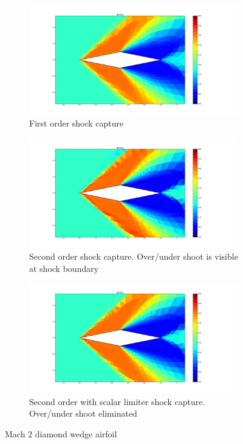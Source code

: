 \documentclass[12pt,parskip=full]{article}
\numberwithin{subsection}{section}
\begin{document}
		\begin{figure}[H]
			\centering
			\begin{subfigure}[H]{0.6\textwidth}
				\includegraphics[width=\textwidth,trim={7cm 2cm 10cm 2cm},clip]{FirstOrderShock.pdf}
				\caption{First order shock capture}
			\end{subfigure}
			\begin{subfigure}[H]{0.6\textwidth}
				\includegraphics[width=\textwidth,trim={7cm 2cm 10cm 2cm},clip]{SecondOrderShock.pdf}
				\caption{Second order shock capture. Over/under shoot is visible at shock boundary}
			\end{subfigure}
			\begin{subfigure}[H]{0.6\textwidth}
				\includegraphics[width=\textwidth,trim={7cm 2cm 10cm 2cm},clip]{SecondOrderScalarLimitedShock.pdf}
				\caption{Second order with scalar limiter shock capture. Over/under shoot eliminated}
			\end{subfigure}
			\caption{Mach 2 diamond wedge airfoil}
		\end{figure}
\end{document}
